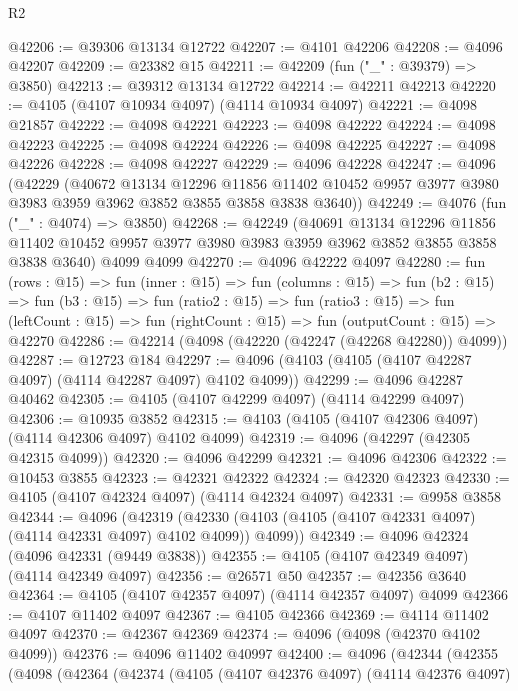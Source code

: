 \begin{lexlean}{R2}
\begin{coremodule}
@42206 := @39306 @13134 @12722
@42207 := @4101 @42206
@42208 := @4096 @42207
@42209 := @23382 @15
@42211 := @42209 (fun ("_" : @39379) => @3850)
@42213 := @39312 @13134 @12722
@42214 := @42211 @42213
@42220 := @4105 (@4107 @10934 @4097) (@4114 @10934 @4097)
@42221 := @4098 @21857
@42222 := @4098 @42221
@42223 := @4098 @42222
@42224 := @4098 @42223
@42225 := @4098 @42224
@42226 := @4098 @42225
@42227 := @4098 @42226
@42228 := @4098 @42227
@42229 := @4096 @42228
@42247 := @4096
    (@42229
      (@40672
        @13134
        @12296
        @11856
        @11402
        @10452
        @9957
        @3977
        @3980
        @3983
        @3959
        @3962
        @3852
        @3855
        @3858
        @3838
        @3640))
@42249 := @4076 (fun ("_" : @4074) => @3850)
@42268 := @42249
    (@40691
      @13134
      @12296
      @11856
      @11402
      @10452
      @9957
      @3977
      @3980
      @3983
      @3959
      @3962
      @3852
      @3855
      @3858
      @3838
      @3640)
    @4099
    @4099
@42270 := @4096 @42222 @4097
@42280 := fun (rows : @15) =>
  fun (inner : @15) =>
  fun (columns : @15) =>
  fun (b2 : @15) =>
  fun (b3 : @15) =>
  fun (ratio2 : @15) =>
  fun (ratio3 : @15) =>
  fun (leftCount : @15) => fun (rightCount : @15) => fun (outputCount : @15) => @42270
@42286 := @42214 (@4098 (@42220 (@42247 (@42268 @42280)) @4099))
@42287 := @12723 @184
@42297 := @4096 (@4103 (@4105 (@4107 @42287 @4097) (@4114 @42287 @4097) @4102 @4099))
@42299 := @4096 @42287 @40462
@42305 := @4105 (@4107 @42299 @4097) (@4114 @42299 @4097)
@42306 := @10935 @3852
@42315 := @4103 (@4105 (@4107 @42306 @4097) (@4114 @42306 @4097) @4102 @4099)
@42319 := @4096 (@42297 (@42305 @42315 @4099))
@42320 := @4096 @42299
@42321 := @4096 @42306
@42322 := @10453 @3855
@42323 := @42321 @42322
@42324 := @42320 @42323
@42330 := @4105 (@4107 @42324 @4097) (@4114 @42324 @4097)
@42331 := @9958 @3858
@42344 := @4096
    (@42319 (@42330 (@4103 (@4105 (@4107 @42331 @4097) (@4114 @42331 @4097) @4102 @4099)) @4099))
@42349 := @4096 @42324 (@4096 @42331 (@9449 @3838))
@42355 := @4105 (@4107 @42349 @4097) (@4114 @42349 @4097)
@42356 := @26571 @50
@42357 := @42356 @3640
@42364 := @4105 (@4107 @42357 @4097) (@4114 @42357 @4097) @4099
@42366 := @4107 @11402 @4097
@42367 := @4105 @42366
@42369 := @4114 @11402 @4097
@42370 := @42367 @42369
@42374 := @4096 (@4098 (@42370 @4102 @4099))
@42376 := @4096 @11402 @40997
@42400 := @4096
    (@42344
      (@42355
        (@4098
          (@42364
            (@42374
              (@4105
                (@4107 @42376 @4097)
                (@4114 @42376 @4097)

\end{coremodule}
\end{lexlean}
